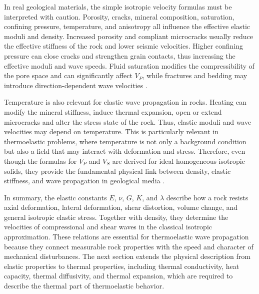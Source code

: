 In real geological materials, the simple isotropic velocity formulas must be interpreted with caution. Porosity, cracks, mineral composition, saturation, confining pressure, temperature, and anisotropy all influence the effective elastic moduli and density. Increased porosity and compliant microcracks usually reduce the effective stiffness of the rock and lower seismic velocities. Higher confining pressure can close cracks and strengthen grain contacts, thus increasing the effective moduli and wave speeds. Fluid saturation modifies the compressibility of the pore space and can significantly affect \(V_P\), while fractures and bedding may introduce direction-dependent wave velocities \cite{mavko2009,jaeger2007,crampin1981,thomsen1986}.

Temperature is also relevant for elastic wave propagation in rocks. Heating can modify the mineral stiffness, induce thermal expansion, open or extend microcracks and alter the stress state of the rock. Thus, elastic moduli and wave velocities may depend on temperature. This is particularly relevant in thermoelastic problems, where temperature is not only a background condition but also a field that may interact with deformation and stress. Therefore, even though the formulas for \(V_P\) and \(V_S\) are derived for ideal homogeneous isotropic solids, they provide the fundamental physical link between density, elastic stiffness, and wave propagation in geological media \cite{robertson1988,turcotte2014,mavko2009}.

In summary, the elastic constants \(E\), \(\nu\), \(G\), \(K\), and \(\lambda\) describe how a rock resists axial deformation, lateral deformation, shear distortion, volume change, and general isotropic elastic stress. Together with density, they determine the velocities of compressional and shear waves in the classical isotropic approximation. These relations are essential for thermoelastic wave propagation because they connect measurable rock properties with the speed and character of mechanical disturbances. The next section extends the physical description from elastic properties to thermal properties, including thermal conductivity, heat capacity, thermal diffusivity, and thermal expansion, which are required to describe the thermal part of thermoelastic behavior.
